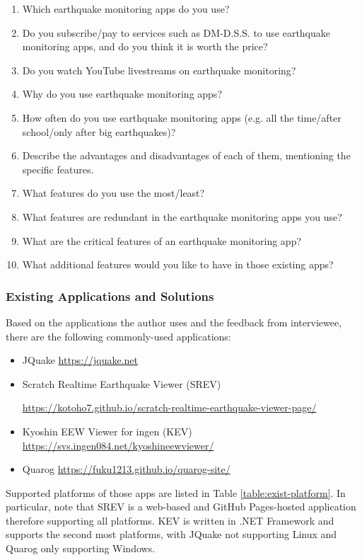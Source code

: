 \documentclass{article}
\begin{document}
\begin{enumerate}
    \item Which earthquake monitoring apps do you use?
    \item Do you subscribe/pay to services such as DM-D.S.S. to use earthquake monitoring apps, and do you think it is worth the price?
    \item Do you watch YouTube livestreams on earthquake monitoring?
    \item Why do you use earthquake monitoring apps?
    \item How often do you use earthquake monitoring apps (e.g. all the time/after school/only after big earthquakes)?
    \item Describe the advantages and disadvantages of each of them, mentioning the specific features.
    \item What features do you use the most/least?
    \item What features are redundant in the earthquake monitoring apps you use?
    \item What are the critical features of an earthquake monitoring app?
    \item What additional features would you like to have in those existing apps?
\end{enumerate}

\subsubsection{Existing Applications and Solutions}

Based on the applications the author uses and the feedback from interviewee, there are the following commonly-used applications:
\begin{itemize}
    \item JQuake \url{https://jquake.net}
    \item Scratch Realtime Earthquake Viewer (SREV)

          \url{https://kotoho7.github.io/scratch-realtime-earthquake-viewer-page/}
    \item Kyoshin EEW Viewer for ingen (KEV) \url{https://svs.ingen084.net/kyoshineewviewer/}
    \item Quarog \url{https://fuku1213.github.io/quarog-site/}
\end{itemize}

Supported platforms of those apps are listed in Table \ref{table:exist-platform}. In particular, note that SREV is a web-based and GitHub Pages-hosted application therefore supporting all platforms. KEV is written in .NET Framework and supports the second most platforms, with JQuake not supporting Linux and Quarog only supporting Windows.
\end{document}
